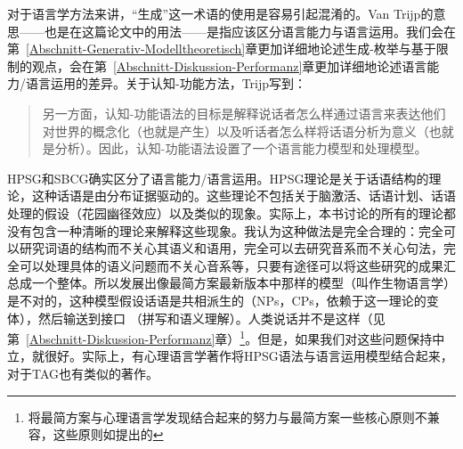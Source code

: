 \label{sec-performance-cxg}

对于语言学方法来讲，“生成”这一术语的使用是容易引起混淆的。Van Trijp的意思——也是在这篇论文中的用法——是指应该区分语言能力与语言运用。我们会在第~\ref{Abschnitt-Generativ-Modelltheoretisch}章更加详细地论述生成-枚举与基于限制的观点，会在第~\ref{Abschnitt-Diskussion-Performanz}章更加详细地论述语言能力/语言运用的差异。关于认知-功能方法，Trijp写到：
\begin{quote}
另一方面，认知-功能语法的目标是解释说话者怎么样通过语言来表达他们对世界的概念化（也就是产生）以及听话者怎么样将话语分析为意义（也就是分析）。因此，认知-功能语法设置了一个语言能力模型和处理模型。 \citep[]{vanTrijp2013a}
\end{quote}
HPSG和SBCG确实区分了语言能力/语言运用\citep{SW2011a}。HPSG理论是关于话语结构的理论，这种话语是由分布证据驱动的。这些理论不包括关于脑激活、话语计划、话语处理的假设（花园幽径效应）以及类似的现象。实际上，本书讨论的所有的理论都没有包含一种清晰的理论来解释这些现象。我认为这种做法是完全合理的：完全可以研究词语的结构而不关心其语义和语用，完全可以去研究音系而不关心句法，完全可以处理具体的语义问题而不关心音系等，只要有途径可以将这些研究的成果汇总成一个整体。所以发展出像最简方案\indexmpc 最新版本中那样的模型（叫作生物语言学）是不对的，这种模型假设话语是共相派生的（NPs，CPs，依赖于这一理论的变体），然后输送到接口 （拼写和语义理解）。人类说话并不是这样（见第~\ref{Abschnitt-Diskussion-Performanz}章）\footnote{
将最简方案与心理语言学发现结合起来的努力与最简方案一些核心原则不兼容，这些原则如\citet{Chomsky2008a}提出的 
}。但是，如果我们对这些问题保持中立，就很好。实际上，有心理语言学著作将HPSG语法与语言运用模型结合起来\citep{Konieczny96a-u}，对于TAG也有类似的著作\citep{SJ93a,DK2008a-u}。
